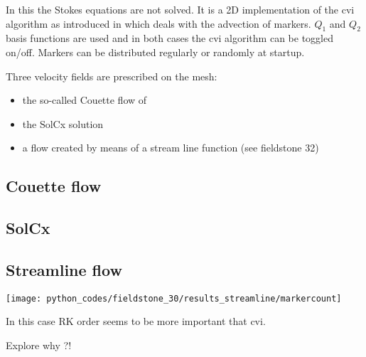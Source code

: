 In this the Stokes equations are not solved. It is a 2D implementation of the cvi algorithm 
as introduced in \cite{waav15} which deals with the advection of markers. 
$Q_1$ and $Q_2$ basis functions are
used and in both cases the cvi algorithm can be toggled on/off. 
Markers can be distributed regularly or randomly at startup.

Three velocity fields are prescribed on the mesh:
\begin{itemize}
\item the so-called Couette flow of \cite{waav15} 
\item the SolCx solution \cite{XX}
\item a flow created by means of a stream line function (see fieldstone 32)
\end{itemize}

\subsection{Couette flow}

\subsection{SolCx}

\subsection{Streamline flow}

\texttt{[image: python\_codes/fieldstone\_30/results\_streamline/markercount]}

In this case RK order seems to be more important that cvi. 

Explore why ?! 








